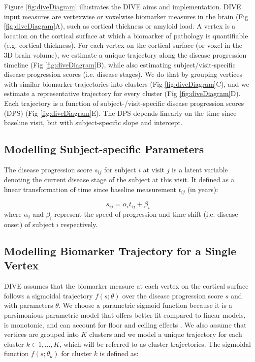 Figure \ref{fig:diveDiagram} illustrates the DIVE aims and implementation. DIVE input measures are vertexwise or voxelwise biomarker measures in the brain (Fig \ref{fig:diveDiagram}\textcolor{blue4}{A}), such as cortical thickness or amyloid load. A vertex is a location on the cortical surface at which a biomarker of pathology is quantifiable (e.g. cortical thickness). For each vertex on the cortical surface (or voxel in the 3D brain volume), we estimate a unique trajectory along the disease progression timeline (Fig \ref{fig:diveDiagram}\textcolor{blue4}{B}), while also estimating subject/visit-specific disease progression scores (i.e. disease stages). We do that by grouping vertices with similar biomarker trajectories into clusters (Fig \ref{fig:diveDiagram}\textcolor{blue4}{C}), and we estimate a representative trajectory for every cluster (Fig \ref{fig:diveDiagram}\textcolor{blue4}{D}). Each trajectory is a function of subject-/visit-specific disease progression scores (DPS) (Fig \ref{fig:diveDiagram}\textcolor{blue4}{E}). The DPS depends linearly on the time since baseline visit, but with subject-specific slope and intercept.

\subsection{Modelling Subject-specific Parameters}

The disease progression score $s_{ij}$ for subject $i$ at visit $j$ is a latent variable denoting the current disease stage of the subject at this visit. It  defined as a linear transformation of time since baseline measurement $t_{ij}$ (in years):

\begin{equation}
\label{eq:dps_vwdpm}
 s_{ij} = \alpha_i t_{ij} + \beta_i
\end{equation}
where $\alpha_i$ and $\beta_i$ represent the speed of progression and time shift (i.e. disease onset) of subject $i$ respectively. 

\subsection{Modelling Biomarker Trajectory for a Single Vertex}

DIVE assumes that the biomarker measure at each vertex on the cortical surface follows a sigmoidal trajectory $f(s ; \theta)$ over the disease progression score $s$ and with parameters $\theta$. We choose a parametric sigmoid function because it is a parsimonious parametric model that offers better fit compared to linear models, is monotonic, and can account for floor and ceiling effects \cite{caroli2010dynamics, sabuncu2011dynamics}. We also assume that vertices are grouped into $K$ clusters and we model a unique trajectory for each cluster $k \in {1, ... , K}$, which will be referred to as cluster trajectories. The sigmoidal function $f(s; \theta_k)$ for cluster $k$ is defined as: 

